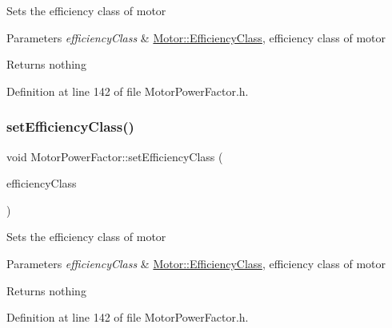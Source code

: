 Sets the efficiency class of motor


\begin{DoxyParams}{Parameters}
{\em efficiency\+Class} & \hyperlink{class_motor_afa022971ae062406a9f588c601673d4e}{Motor\+::\+Efficiency\+Class}, efficiency class of motor\\
\hline
\end{DoxyParams}
\begin{DoxyReturn}{Returns}
nothing 
\end{DoxyReturn}


Definition at line 142 of file Motor\+Power\+Factor.\+h.

\mbox{\label{class_motor_power_factor_add3125243d7f11131abc4e1d172ffdfc}} 
\subsubsection{\texorpdfstring{set\+Efficiency\+Class()}{setEfficiencyClass()}\hspace{0.1cm}{\footnotesize\ttfamily [3/3]}}
{\footnotesize\ttfamily void Motor\+Power\+Factor\+::set\+Efficiency\+Class (\begin{DoxyParamCaption}\item[{\hyperlink{class_motor_afa022971ae062406a9f588c601673d4e}{Motor\+::\+Efficiency\+Class}}]{efficiency\+Class }\end{DoxyParamCaption})\hspace{0.3cm}{\ttfamily [inline]}}

Sets the efficiency class of motor


\begin{DoxyParams}{Parameters}
{\em efficiency\+Class} & \hyperlink{class_motor_afa022971ae062406a9f588c601673d4e}{Motor\+::\+Efficiency\+Class}, efficiency class of motor\\
\hline
\end{DoxyParams}
\begin{DoxyReturn}{Returns}
nothing 
\end{DoxyReturn}


Definition at line 142 of file Motor\+Power\+Factor.\+h.

\mbox{\label{class_motor_power_factor_a5186ccae4191cfc5b2b7c3bdbd166563}} 
